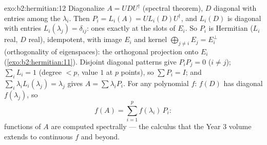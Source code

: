 \begin{solution}{exo:b2:hermitian:12}
Diagonalize $A = U D U^\dagger$ (spectral theorem), $D$ diagonal
with entries among the $\lambda_i$. Then $P_i = L_i(A) = U
L_i(D)U^\dagger$, and $L_i(D)$ is diagonal with entries
$L_i(\lambda_j) = \delta_{ij}$: ones exactly at the slots of
$E_i$. So $P_i$ is Hermitian ($L_i$ real, $D$ real), idempotent,
with image $E_i$ and kernel $\bigoplus_{j\neq i}E_j = E_i^\perp$
(orthogonality of eigenspaces): the orthogonal projection onto
$E_i$ (\cref{exo:b2:hermitian:11}). Disjoint diagonal patterns
give $P_iP_j = 0$ ($i \neq j$); $\sum_i L_i = 1$ (degree $< p$,
value $1$ at $p$ points), so $\sum P_i = I$; and $\sum_i
\lambda_iL_i(\lambda_j) = \lambda_j$ gives $A = \sum
\lambda_iP_i$. For any polynomial $f$: $f(D)$ has diagonal
$f(\lambda_j)$, so
\[
f(A) = \sum_{i=1}^{p} f(\lambda_i)\,P_i :
\]
functions of $A$ are computed spectrally --- the calculus that
the Year 3 volume extends to continuous $f$ and beyond.
\end{solution}

